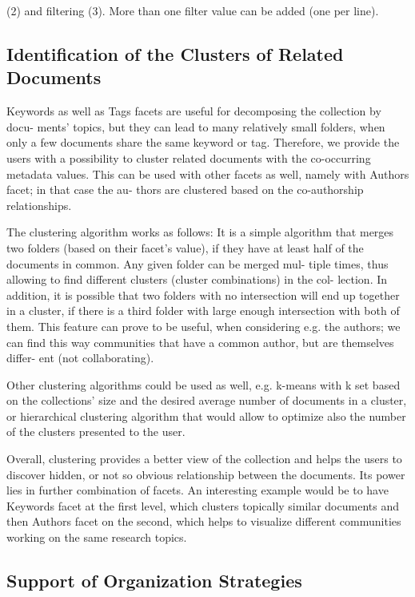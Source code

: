 \documentclass{llncs}
\begin{document}
(2) and filtering (3). More than one filter value can be added (one per line).


\subsection{Identification of the Clusters of Related Documents}

Keywords as well as Tags facets are useful for decomposing the collection by docu- ments’ topics, but they can lead to many relatively small folders, when only a few documents share the same keyword or tag. Therefore, we provide the users with a possibility to cluster related documents with the co-occurring metadata values. This can be used with other facets as well, namely with Authors facet; in that case the au- thors are clustered based on the co-authorship relationships.

The clustering algorithm works as follows:
It is a simple algorithm that merges two folders (based on their facet’s value), if they have at least half of the documents in common. Any given folder can be merged mul- tiple times, thus allowing to find different clusters (cluster combinations) in the col- lection. In addition, it is possible that two folders with no intersection will end up
together in a cluster, if there is a third folder with large enough intersection with both of them. This feature can prove to be useful, when considering e.g. the authors; we can find this way communities that have a common author, but are themselves differ- ent (not collaborating).

Other clustering algorithms could be used as well, e.g. k-means with k set based on the collections’ size and the desired average number of documents in a cluster, or hierarchical clustering algorithm that would allow to optimize also the number of the clusters presented to the user.

Overall, clustering provides a better view of the collection and helps the users to discover hidden, or not so obvious relationship between the documents. Its power lies in further combination of facets. An interesting example would be to have Keywords facet at the first level, which clusters topically similar documents and then Authors facet on the second, which helps to visualize different communities working on the same research topics.

\subsection{Support of Organization Strategies}
\end{document}
